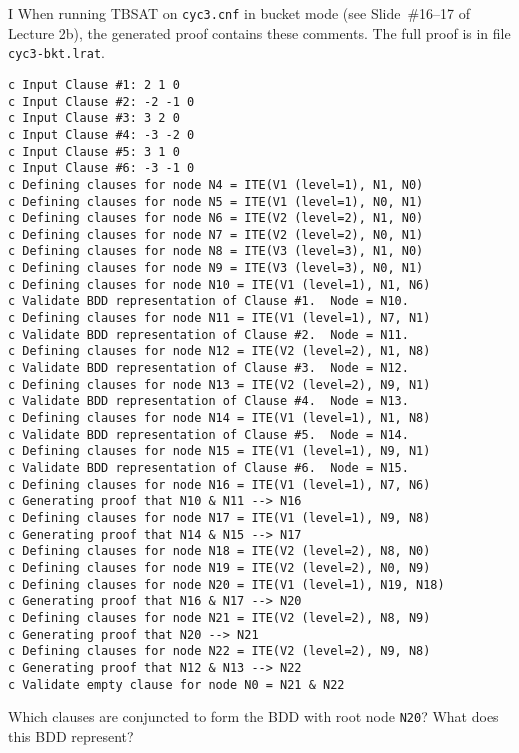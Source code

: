 \newpage

\begin{problem}{I}
When running TBSAT on \texttt{cyc3.cnf} in bucket mode (see Slide~\#16--17 of Lecture 2b), the generated proof contains these comments.
The full proof is in file \texttt{cyc3-bkt.lrat}.

\begin{lstlisting}
c Input Clause #1: 2 1 0
c Input Clause #2: -2 -1 0
c Input Clause #3: 3 2 0
c Input Clause #4: -3 -2 0
c Input Clause #5: 3 1 0
c Input Clause #6: -3 -1 0
c Defining clauses for node N4 = ITE(V1 (level=1), N1, N0)
c Defining clauses for node N5 = ITE(V1 (level=1), N0, N1)
c Defining clauses for node N6 = ITE(V2 (level=2), N1, N0)
c Defining clauses for node N7 = ITE(V2 (level=2), N0, N1)
c Defining clauses for node N8 = ITE(V3 (level=3), N1, N0)
c Defining clauses for node N9 = ITE(V3 (level=3), N0, N1)
c Defining clauses for node N10 = ITE(V1 (level=1), N1, N6)
c Validate BDD representation of Clause #1.  Node = N10.
c Defining clauses for node N11 = ITE(V1 (level=1), N7, N1)
c Validate BDD representation of Clause #2.  Node = N11.
c Defining clauses for node N12 = ITE(V2 (level=2), N1, N8)
c Validate BDD representation of Clause #3.  Node = N12.
c Defining clauses for node N13 = ITE(V2 (level=2), N9, N1)
c Validate BDD representation of Clause #4.  Node = N13.
c Defining clauses for node N14 = ITE(V1 (level=1), N1, N8)
c Validate BDD representation of Clause #5.  Node = N14.
c Defining clauses for node N15 = ITE(V1 (level=1), N9, N1)
c Validate BDD representation of Clause #6.  Node = N15.
c Defining clauses for node N16 = ITE(V1 (level=1), N7, N6)
c Generating proof that N10 & N11 --> N16
c Defining clauses for node N17 = ITE(V1 (level=1), N9, N8)
c Generating proof that N14 & N15 --> N17
c Defining clauses for node N18 = ITE(V2 (level=2), N8, N0)
c Defining clauses for node N19 = ITE(V2 (level=2), N0, N9)
c Defining clauses for node N20 = ITE(V1 (level=1), N19, N18)
c Generating proof that N16 & N17 --> N20
c Defining clauses for node N21 = ITE(V2 (level=2), N8, N9)
c Generating proof that N20 --> N21
c Defining clauses for node N22 = ITE(V2 (level=2), N9, N8)
c Generating proof that N12 & N13 --> N22
c Validate empty clause for node N0 = N21 & N22
\end{lstlisting}

\newpage
\begin{choice}
\item Which clauses are conjuncted to form the BDD with root node \texttt{N20}?  What does this BDD represent?


\end{choice}
\end{problem}
